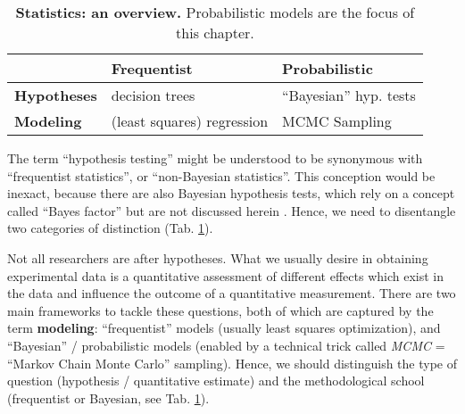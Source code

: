 \begin{table}[h!]
\caption{\label{tab:statistics}\textbf{Statistics: an overview.} Probabilistic models are the focus of this chapter.}
\centering
\begin{tabular}{|l|l|l|}
\hline
 & \textbf{Frequentist} & \textbf{Probabilistic}\\[0pt]
\hline
\textbf{Hypotheses} & decision trees & ``Bayesian'' hyp. tests\\[0pt]
\hline
\textbf{Modeling} & (least squares) regression & MCMC Sampling\\[0pt]
\hline
\end{tabular}
\end{table}



\FloatBarrier
The term ``hypothesis testing'' might be understood to be synonymous with ``frequentist statistics'', or ``non-Bayesian statistics''.
This conception would be inexact, because there are also Bayesian hypothesis tests, which rely on a concept called ``Bayes factor'' but are not discussed herein \citep[cf.][]{Shikano2019}.
Hence, we need to disentangle two categories of distinction (Tab. \ref{tab:statistics}).

Not all researchers are after hypotheses.
What we usually desire in obtaining experimental data is a quantitative assessment of different effects which exist in the data and influence the outcome of a quantitative measurement.
There are two main frameworks to tackle these questions, both of which are captured by the term \textbf{modeling}: ``frequentist'' models (usually least squares optimization), and ``Bayesian'' / probabilistic models (enabled by a technical trick called \emph{MCMC} = ``Markov Chain Monte Carlo'' sampling).
Hence, we should distinguish the type of question (hypothesis / quantitative estimate) and the methodological school (frequentist or Bayesian, see Tab. \ref{tab:statistics}).



